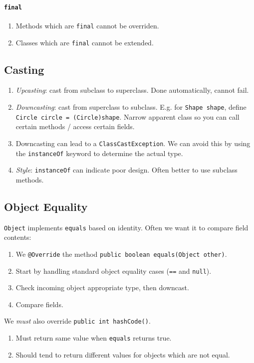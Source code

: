 \documentclass[twocolumn,english]{article}
\begin{document}
\paragraph{\texttt{final}}
\begin{enumerate}
\item Methods which are \texttt{final} cannot be overriden.
\item Classes which are \texttt{final} cannot be extended.
\end{enumerate}

\subsection{Casting}
\begin{enumerate}
\item \emph{Upcasting}: cast from subclass to superclass. Done automatically,
cannot fail.
\item \emph{Downcasting}: cast from superclass to subclass. E.g. for \texttt{Shape
shape}, define \texttt{Circle circle = (Circle)shape}. Narrow apparent
class so you can call certain methods / access certain fields.
\item Downcasting can lead to a \texttt{ClassCastException}. We can avoid
this by using the \texttt{instanceOf} keyword to determine the actual
type.
\item \emph{Style}: \texttt{instanceOf} can indicate poor design. Often
better to use subclass methods.
\end{enumerate}

\subsection{Object Equality}

\texttt{Object} implements \texttt{equals} based on identity. Often
we want it to compare field contents:
\begin{enumerate}
\item We \texttt{@Override} the method \texttt{public boolean equals(Object
other)}.
\item Start by handling standard object equality cases (\texttt{==} and
\texttt{null}).
\item Check incoming object appropriate type, then downcast.
\item Compare fields.
\end{enumerate}
We \emph{must} also override \texttt{public int hashCode()}.
\begin{enumerate}
\item Must return same value when \texttt{equals} returns true.
\item Should tend to return different values for objects which are not equal.
\end{enumerate}
\end{document}
